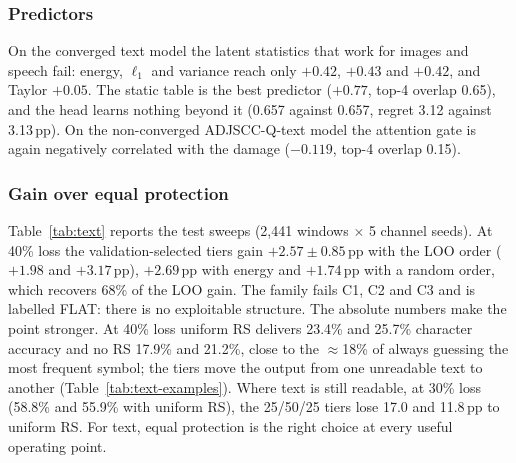 \documentclass[journal]{IEEEtran}
\newcommand{\pp}{\,pp}
\begin{document}
\subsubsection{Predictors}
On the converged text model the latent statistics that work for images and speech fail: energy, $\ell_1$
and variance reach only $+0.42$, $+0.43$ and $+0.42$, and Taylor $+0.05$. The static table is the best
predictor ($+0.77$, top-4 overlap 0.65), and the head learns nothing beyond it (0.657 against 0.657, regret
3.12 against 3.13\pp). On the non-converged ADJSCC-Q-text model the attention gate is again negatively
correlated with the damage ($-0.119$, top-4 overlap 0.15).

\subsubsection{Gain over equal protection}
Table~\ref{tab:text} reports the test sweeps (2,441 windows $\times$ 5 channel seeds). At 40\% loss the
validation-selected tiers gain $+2.57\pm0.85$\pp{} with the LOO order ($+1.98$ and $+3.17$\pp), $+2.69$\pp{}
with energy and $+1.74$\pp{} with a random order, which recovers 68\% of the LOO gain. The family fails C1,
C2 and C3 and is labelled FLAT: there is no exploitable structure. The absolute numbers make the point
stronger. At 40\% loss uniform RS delivers 23.4\% and 25.7\% character accuracy and no RS 17.9\% and
21.2\%, close to the $\approx$18\% of always guessing the most frequent symbol; the tiers move the output from
one unreadable text to another (Table~\ref{tab:text-examples}). Where text is still readable, at 30\% loss
(58.8\% and 55.9\% with uniform RS), the 25/50/25 tiers lose 17.0 and 11.8\pp{} to uniform RS. For text,
equal protection is the right choice at every useful operating point.

\begin{table}[t]\centering
\caption{Text (text8 test, 2,441 windows $\times$ 5 channel seeds): character accuracy (\%) of uniform RS
and paired gain (pp) of the 25/50/25 tiers}\label{tab:text}
\end{table}
\end{document}
